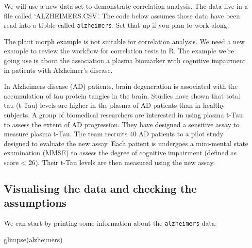 \documentclass[
]{book}
\newenvironment{Shaded}{\begin{snugshade}}{\end{snugshade}}
\newcommand{\FunctionTok}[1]{\textcolor[rgb]{0.00,0.00,0.00}{#1}}
\newcommand{\NormalTok}[1]{#1}
\newenvironment{greybox}{
  \definecolor{shadecolor}{rgb}{0.95,0.95,0.95}  %
  \color{black}
  \begin{shaded}}
 {\end{shaded}}
\newenvironment{infobox}[1]
  {
  \begin{itemize}
  \renewcommand{\labelitemi}{
    \raisebox{-.7\height}[0pt][0pt]{
      {\setkeys{Gin}{width=3em,keepaspectratio}
        \texttt{[image: images/\#1]}}
    }
  }
  \setlength{\fboxsep}{1em}
  \begin{greybox}
  \item
  }
  {
  \end{greybox}
  \end{itemize}
  }
\begin{document}
\begin{infobox}{action}

\hypertarget{section-5}{%
\subsubsection*{}\label{section-5}}

We will use a new data set to demonstrate correlation analysis. The data live in a file called `ALZHEIMERS.CSV'. The code below assumes those data have been read into a tibble called \texttt{alzheimers}. Set that up if you plan to work along.

\end{infobox}

The plant morph example is not suitable for correlation analysis. We need a new example to review the workflow for correlation tests in R. The example we're going use is about the association a plasma biomarker with cognitive impairment in patients with Alzheimer's disease.

In Alzheimer\textquotesingle s disease (AD) patients, brain degeneration is associated with the accumulation of tau protein tangles in the brain. Studies have shown that total tau (t-Tau) levels are higher in the plasma of AD patients than in healthy subjects. A group of biomedical researchers are interested in using plasma t-Tau to assess the extent of AD progression. They have designed a sensitive assay to measure plasma t-Tau. The team recruits 40 AD patients to a pilot study designed to evaluate the new assay. Each patient is undergoes a mini-mental state examination (MMSE) to assess the degree of cognitive impairment (defined as score \textless{} 26). Their t-Tau levels are then measured using the new assay.

\hypertarget{visualising-the-data-and-checking-the-assumptions-2}{%
\subsection{Visualising the data and checking the assumptions}\label{visualising-the-data-and-checking-the-assumptions-2}}

We can start by printing some information about the \texttt{alzheimers} data:

\begin{Shaded}
\begin{Highlighting}[]
\FunctionTok{glimpse}\NormalTok{(alzheimers)}
\end{Highlighting}
\end{Shaded}
\end{document}
